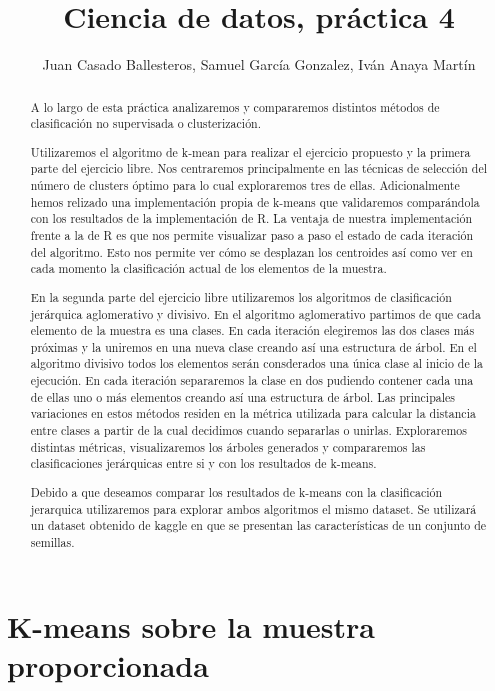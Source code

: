 \documentclass [a4paper] {article}
\title{Ciencia de datos, práctica 4}
\author{Juan Casado Ballesteros, Samuel García Gonzalez, Iván Anaya Martín}
\begin{document}
\maketitle

\begin{abstract}
A lo largo de esta práctica analizaremos y compararemos distintos métodos de clasificación no supervisada o clusterización.

Utilizaremos el algoritmo de k-mean para realizar el ejercicio propuesto y la primera parte del ejercicio libre.
Nos centraremos principalmente en las técnicas de selección del número de clusters óptimo para lo cual exploraremos tres de ellas.
Adicionalmente hemos relizado una implementación propia de k-means que validaremos comparándola con los resultados de la implementación de R.
La ventaja de nuestra implementación frente a la de R es que nos permite visualizar paso a paso el estado de cada iteración del algoritmo.
Esto nos permite ver cómo se desplazan los centroides así como ver en cada momento la clasificación actual de los elementos de la muestra.

En la segunda parte del ejercicio libre utilizaremos los algoritmos de clasificación jerárquica aglomerativo y divisivo.
En el algoritmo aglomerativo partimos de que cada elemento de la muestra es una clases.
En cada iteración elegiremos las dos clases más próximas y la uniremos en una nueva clase creando así una estructura de árbol.
En el algoritmo divisivo todos los elementos serán consderados una única clase al inicio de la ejecución.
En cada iteración separaremos la clase en dos pudiendo contener cada una de ellas uno o más elementos creando así una estructura de árbol.
Las principales variaciones en estos métodos residen en la métrica utilizada para calcular la distancia entre clases a partir de la cual decidimos cuando separarlas o unirlas.
Exploraremos distintas métricas, visualizaremos los árboles generados y compararemos las clasificaciones jerárquicas entre si y con los resultados de k-means.

Debido a que deseamos comparar los resultados de k-means con la clasificación jerarquica utilizaremos para explorar ambos algoritmos el mismo dataset.
Se utilizará un dataset obtenido de kaggle en que se presentan las características de un conjunto de semillas.
\end{abstract}

\newpage
\tableofcontents


\newpage
\section{K-means sobre la muestra proporcionada}
\end{document}
